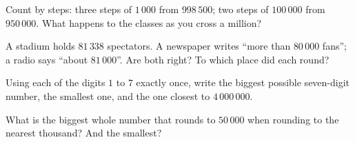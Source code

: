 \begin{exercise}[$\star$]\label{exo:g4:numbers:8}
Count by steps: three steps of $1\,000$ from $998\,500$; two steps
of $100\,000$ from $950\,000$. What happens to the classes as you
cross a million?
\end{exercise}

\begin{exercise}[$\star$]\label{exo:g4:numbers:9}
A stadium holds $81\,338$ spectators. A newspaper writes ``more than
$80\,000$ fans''; a radio says ``about $81\,000$''. Are both
right? To which place did each round?
\end{exercise}

\begin{exercise}[$\star\star$]\label{exo:g4:numbers:10}
Using each of the digits $1$ to $7$ exactly once, write the biggest
possible seven-digit number, the smallest one, and the one closest to
$4\,000\,000$.
\end{exercise}

\begin{exercise}[$\star\star$]\label{exo:g4:numbers:11}
What is the biggest whole number that rounds to $50\,000$ when
rounding to the nearest thousand? And the smallest?
\end{exercise}
